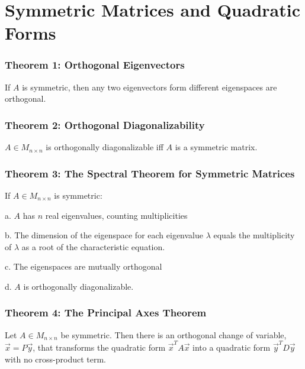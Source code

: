 \documentclass{article}
\begin{document}
\section{Symmetric Matrices and Quadratic Forms}
\subsubsection*{Theorem 1: Orthogonal Eigenvectors}
If $A$ is symmetric, then any two eigenvectors form different eigenspaces are orthogonal. 

\subsubsection*{Theorem 2: Orthogonal Diagonalizability}
$A \in M_{n \times n}$ is orthogonally diagonalizable iff $A$ is a symmetric matrix. 

\subsubsection*{Theorem 3: The Spectral Theorem for Symmetric Matrices}
If $A \in M_{n \times n}$ is symmetric:

a. $A$ has $n$ real eigenvalues, counting multiplicities

b. The dimension of the eigenspace for each eigenvalue $\lambda$ equals the multiplicity of $\lambda$ as a root of the characteristic equation.

c. The eigenspaces are mutually orthogonal

d. $A$ is orthogonally diagonalizable. 

\subsubsection*{Theorem 4: The Principal Axes Theorem}
Let $A \in M_{n \times n}$ be symmetric. Then there is an orthogonal change of variable, $\vec x = P \vec y$, that transforms the quadratic form $\vec x^T A \vec x$ into a quadratic form $\vec y^T D \vec y$ with no cross-product term. 
\end{document}
